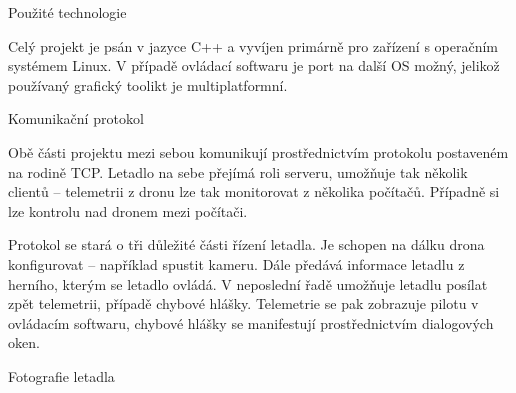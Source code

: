 \documentclass[final]{beamer}
\newlength{\colwidth}
\begin{document}
\begin{frame}[t]
\begin{columns}[t]
\begin{column}{\colwidth}
\begin{block}{Použité technologie}
\begin{figure}
          \hfill
          \hfill

        \end{figure}

			Celý projekt je psán v jazyce C++ a vyvíjen primárně pro zařízení s operačním systémem Linux.
			V případě ovládací softwaru je port na další OS možný, jelikož používaný grafický toolikt je multiplatformní.



      \end{block}

      \begin{block}{Komunikační protokol}

				Obě části projektu mezi sebou komunikují prostřednictvím protokolu postaveném na rodině TCP.
				Letadlo na sebe přejímá roli serveru, umožňuje tak několik clientů -- telemetrii z dronu lze tak monitorovat z několika počítačů.
				Případně si lze  kontrolu nad dronem mezi počítači.

				Protokol se stará o tři důležité části řízení letadla.
				Je schopen na dálku drona konfigurovat -- například spustit kameru.
				Dále předává informace letadlu z herního, kterým se letadlo ovládá.
				V neposlední řadě umožňuje letadlu posílat zpět telemetrii, případě chybové hlášky.
				Telemetrie se pak zobrazuje pilotu v ovládacím softwaru, chybové hlášky se manifestují prostřednictvím dialogových oken.
      \end{block}

      \begin{block}{Fotografie letadla}



\end{block}
\end{column}
\end{columns}
\end{frame}
\end{document}
